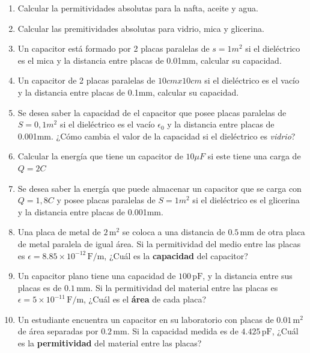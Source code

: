 \documentclass[../main]{subfiles}
\begin{document}
\begin{enumerate}
    \item Calcular la permitividades absolutas para la nafta, aceite y agua.
    \item Calcular las premitividades absolutas para vidrio, mica y glicerina.
    \item Un capacitor está formado por 2 placas paralelas de $s=1m^2$ si el dieléctrico es el mica y la distancia entre placas de 0.01mm, calcular su capacidad.
    
    \item Un capacitor de 2 placas paralelas de $10cmx10cm$ si el dieléctrico es el vacío y la distancia entre placas de 0.1mm, calcular su capacidad.
    
    \item Se desea saber la capacidad de el capacitor que posee placas paralelas de $S=0,1m^2$ si el dieléctrico es el vacío $\epsilon_0$ y la distancia entre placas de 0.001mm. ¿Cómo cambia el valor de la capacidad si el dieléctrico es \emph{vidrio}?
    
    \item Calcular la energía que tiene un capacitor de $10\mu F$ si este tiene una carga de $Q=2C$

     \item Se desea saber la energía que puede almacenar un capacitor que se carga con $Q=1,8C$ y posee placas paralelas de $S=1m^2$ si el dieléctrico es el glicerina y la distancia entre placas de 0.001mm.

    \item Una placa de metal de $2 \, \text{m}^2$ se coloca a una distancia de $0.5 \, \text{mm}$ de otra placa de metal paralela de igual área. Si la permitividad del medio entre las placas es $\epsilon = 8.85 \times 10^{-12} \, \text{F/m}$, ¿Cuál es la \textbf{capacidad} del capacitor?

    \item Un capacitor plano tiene una capacidad de $100 \, \text{pF}$, y la distancia entre sus placas es de $0.1 \, \text{mm}$. Si la permitividad del material entre las placas es $\epsilon = 5 \times 10^{-11} \, \text{F/m}$, ¿Cuál es el \textbf{área} de cada placa?

    \item Un estudiante encuentra un capacitor en su laboratorio con placas de $0.01 \, \text{m}^2$ de área separadas por $0.2 \, \text{mm}$. Si la capacidad medida es de $4.425 \, \text{pF}$, ¿Cuál es la \textbf{permitividad} del material entre las placas?


\end{enumerate}
\end{document}
